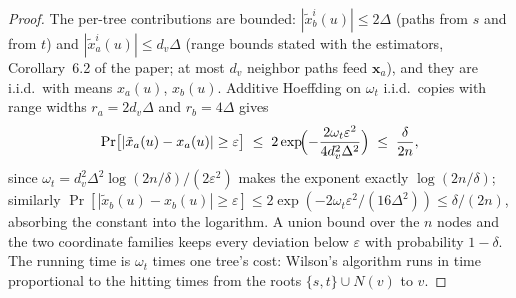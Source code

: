 \begin{proof}
The per-tree contributions are bounded: $|\tilde x_b^i(u)| \le 2\Delta$ (paths from $s$ and
from $t$) and $|\tilde x_a^i(u)| \le d_v\Delta$ (range bounds stated with the estimators,
Corollary~6.2 of the paper; at most $d_v$ neighbor paths feed $\mathbf{x}_a$), and they are
i.i.d.\ with means $x_a(u)$, $x_b(u)$. Additive Hoeffding on $\omega_t$ i.i.d.\ copies with
range widths $r_a = 2d_v\Delta$ and $r_b = 4\Delta$ gives
\[
\Pr\bigl[|\tilde x_a(u) - x_a(u)| \ge \varepsilon\bigr] \;\le\;
2\exp\!\Bigl(-\frac{2\omega_t\varepsilon^2}{4d_v^2\Delta^2}\Bigr) \;\le\; \frac{\delta}{2n},
\]
since $\omega_t = d_v^2\Delta^2\log(2n/\delta)/(2\varepsilon^2)$ makes the exponent exactly
$\log(2n/\delta)$; similarly $\Pr[|\tilde x_b(u) - x_b(u)| \ge \varepsilon] \le
2\exp(-2\omega_t\varepsilon^2/(16\Delta^2)) \le \delta/(2n)$, absorbing the constant into the
logarithm. A union bound over the $n$ nodes and the two coordinate families keeps every
deviation below $\varepsilon$ with probability $1-\delta$. The running time is $\omega_t$ times
one tree's cost: Wilson's algorithm runs in time proportional to the hitting times from the
roots $\{s,t\}\cup N(v)$ to $v$.
\end{proof}



